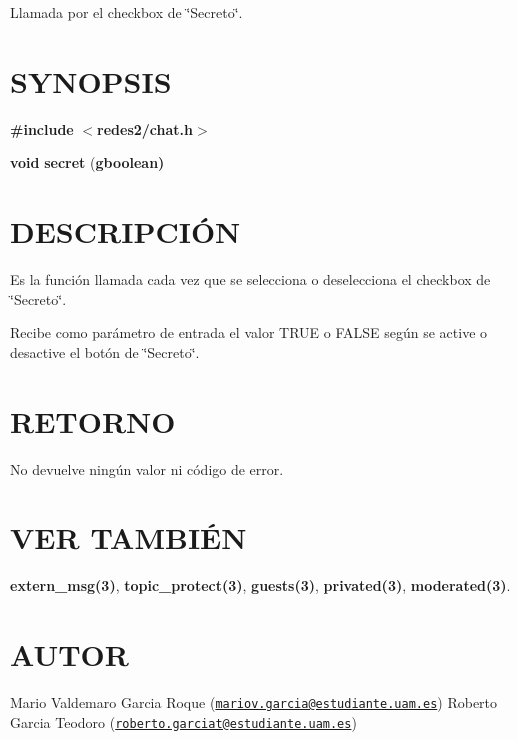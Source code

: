 Llamada por el checkbox de \char`\"{}\-Secreto\char`\"{}.\hypertarget{getTamanoFichero_SYNOPSIS}{}\section{S\-Y\-N\-O\-P\-S\-I\-S}\label{getTamanoFichero_SYNOPSIS}
{\bfseries \#include} {\bfseries $<$redes2/chat.\-h$>$} 

{\bfseries void} {\bfseries secret} {\bfseries }({\bfseries gboolean{\bfseries })} \hypertarget{getTamanoFichero_descripcion}{}\section{D\-E\-S\-C\-R\-I\-P\-C\-IÓ\-N}\label{getTamanoFichero_descripcion}
Es la función llamada cada vez que se selecciona o deselecciona el checkbox de \char`\"{}\-Secreto\char`\"{}.

Recibe como parámetro de entrada el valor T\-R\-U\-E o F\-A\-L\-S\-E según se active o desactive el botón de \char`\"{}\-Secreto\char`\"{}.\hypertarget{getTamanoFichero_retorno}{}\section{R\-E\-T\-O\-R\-N\-O}\label{getTamanoFichero_retorno}
No devuelve ningún valor ni código de error.\hypertarget{servidorArchivo_seealso}{}\section{V\-E\-R T\-A\-M\-B\-IÉ\-N}\label{servidorArchivo_seealso}
{\bfseries extern\-\_\-msg(3)}, {\bfseries topic\-\_\-protect(3)}, {\bfseries guests(3)}, {\bfseries privated(3)}, {\bfseries moderated(3)}.\hypertarget{getTamanoFichero_authors}{}\section{A\-U\-T\-O\-R}\label{getTamanoFichero_authors}
Mario Valdemaro Garcia Roque (\href{mailto:mariov.garcia@estudiante.uam.es}{\tt mariov.\-garcia@estudiante.\-uam.\-es}) Roberto Garcia Teodoro (\href{mailto:roberto.garciat@estudiante.uam.es}{\tt roberto.\-garciat@estudiante.\-uam.\-es}) 